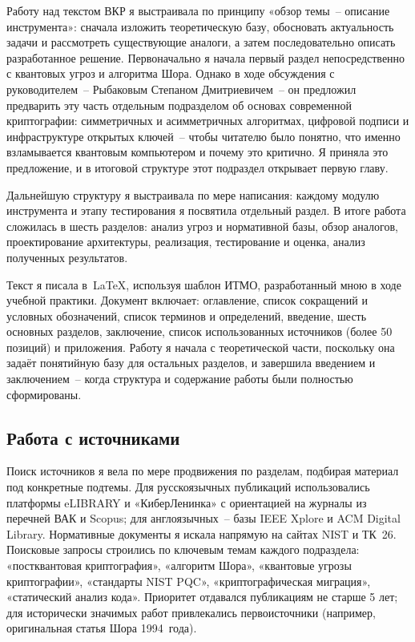 \documentclass{itmo-vkr}
\begin{document}
Работу над текстом ВКР я выстраивала по принципу «обзор темы~-- описание инструмента»: сначала изложить теоретическую базу, обосновать актуальность задачи и рассмотреть существующие аналоги, а затем последовательно описать разработанное решение. Первоначально я начала первый раздел непосредственно с квантовых угроз и алгоритма Шора. Однако в ходе обсуждения с руководителем~-- Рыбаковым Степаном Дмитриевичем~-- он предложил предварить эту часть отдельным подразделом об основах современной криптографии: симметричных и асимметричных алгоритмах, цифровой подписи и инфраструктуре открытых ключей~-- чтобы читателю было понятно, что именно взламывается квантовым компьютером и почему это критично. Я приняла это предложение, и в итоговой структуре этот подраздел открывает первую главу.

Дальнейшую структуру я выстраивала по мере написания: каждому модулю инструмента и этапу тестирования я посвятила отдельный раздел. В итоге работа сложилась в шесть разделов: анализ угроз и нормативной базы, обзор аналогов, проектирование архитектуры, реализация, тестирование и оценка, анализ полученных результатов.

Текст я писала в~\LaTeX{}, используя шаблон ИТМО, разработанный мною в ходе учебной практики. Документ включает: оглавление, список сокращений и условных обозначений, список терминов и определений, введение, шесть основных разделов, заключение, список использованных источников (более 50 позиций) и приложения. Работу я начала с теоретической части, поскольку она задаёт понятийную базу для остальных разделов, и завершила введением и заключением~-- когда структура и содержание работы были полностью сформированы.

\subsection{Работа с источниками}

Поиск источников я вела по мере продвижения по разделам, подбирая материал под конкретные подтемы. Для русскоязычных публикаций использовались платформы eLIBRARY и «КиберЛенинка» с ориентацией на журналы из перечней ВАК и Scopus; для англоязычных~-- базы IEEE Xplore и ACM Digital Library. Нормативные документы я искала напрямую на сайтах NIST и ТК~26. Поисковые запросы строились по ключевым темам каждого подраздела: «постквантовая криптография», «алгоритм Шора», «квантовые угрозы криптографии», «стандарты NIST PQC», «криптографическая миграция», «статический анализ кода». Приоритет отдавался публикациям не старше 5 лет; для исторически значимых работ привлекались первоисточники (например, оригинальная статья Шора 1994~года).
\end{document}
